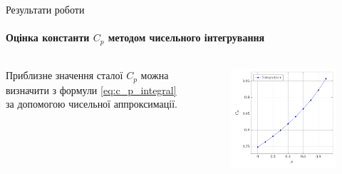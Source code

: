 \begin{frame}{Результати роботи}
	\framesubtitle{Оцінка константи $C_{p}$ методом чисельного інтегрування}
	\begin{columns}
		\begin{column}{0.5\textwidth}
			Приблизне значення сталої $C_{p}$ можна визначити з формули \eqref{eq:c_p_integral} за допомогою чисельної аппроксимації.
		\end{column}
		\begin{column}{0.5\textwidth}
			\begin{figure}
				\centering
				\includegraphics[scale=0.5]{im/integ_cp}
			\end{figure}
		\end{column}
	\end{columns}
\end{frame}

